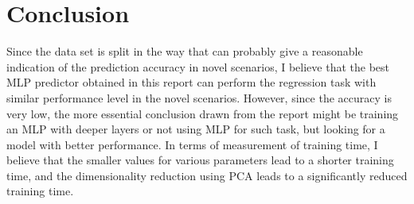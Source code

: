 \documentclass[letterpaper, 12 pt, conference]{ieeeconf}  %
\begin{document}
\section{Conclusion}
Since the data set is split in the way that can probably give a reasonable indication of the prediction accuracy in novel scenarios, I believe that the best MLP predictor obtained in this report can perform the regression task with similar performance level in the novel scenarios. However, since the accuracy is very low, the more essential conclusion drawn from the report might be training an MLP with deeper layers or not using MLP for such task, but looking for a model with better performance. In terms of measurement of training time, I believe that the smaller values for various parameters lead to a shorter training time, and the dimensionality reduction using PCA leads to a significantly reduced training time.
\end{document}
